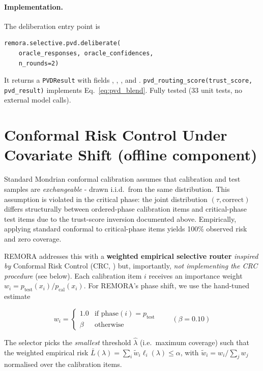 \documentclass[10pt,twocolumn]{article}
\begin{document}
\paragraph{Implementation.}
The deliberation entry point is
\begin{lstlisting}
remora.selective.pvd.deliberate(
    oracle_responses, oracle_confidences,
    n_rounds=2)
\end{lstlisting}
It returns a \texttt{PVDResult} with fields
, ,
, and .
\texttt{pvd\_routing\_score(trust\_score, pvd\_result)} implements
Eq.~\ref{eq:pvd_blend}.  Fully tested (33 unit tests, no external
model calls).

\section{Conformal Risk Control Under Covariate Shift (offline component)}
\label{app:crc}


Standard Mondrian conformal calibration assumes that calibration and
test samples are \emph{exchangeable} - drawn i.i.d.\ from the same
distribution.  This assumption is violated in the critical phase: the
joint distribution $(\tau, \text{correct})$ differs structurally
between ordered-phase calibration items and critical-phase test items
due to the trust-score inversion documented above.  Empirically,
applying standard conformal to critical-phase items yields 100\%
observed risk and zero coverage.

REMORA addresses this with a \textbf{weighted empirical selective
router} \emph{inspired by} Conformal Risk Control (CRC,
\cite{angelopoulos2022crc}) but, importantly, \emph{not
implementing the CRC procedure} (see below).  Each calibration item $i$
receives an importance weight $w_i = p_{\text{test}}(x_i) /
p_{\text{cal}}(x_i)$.  For REMORA's phase shift, we use the
hand-tuned estimate

\begin{equation}
  w_i = \begin{cases} 1.0 & \text{if phase}(i) = p_{\text{test}} \\
                      \beta & \text{otherwise} \end{cases}
  \qquad (\beta = 0.10)
  \label{eq:phase_weights}
\end{equation}

The selector picks the \emph{smallest} threshold $\hat{\lambda}$ (i.e.\
maximum coverage) such that the weighted empirical risk
$\bar{L}(\lambda) = \sum_i \tilde{w}_i \ell_i(\lambda) \leq \alpha$,
with $\tilde{w}_i = w_i / \sum_j w_j$ normalised over the calibration
items.
\end{document}
